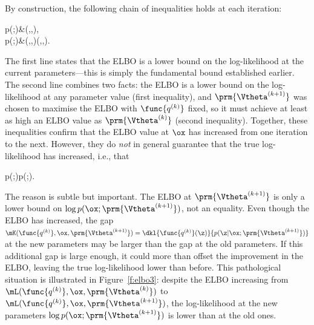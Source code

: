 By construction, the following chain of inequalities holds at each iteration:
\begin{myalign}
\log p(\ox;)&\geq \mL(,\ox,),\\
\log p(\ox;)&\geq \mL(,\ox,)\geq \mL(,\ox,).
\end{myalign}
The first line states that the ELBO is a lower bound on the log-likelihood at the current
parameters---this is simply the fundamental bound established earlier. The second line
combines two facts: the ELBO is a lower bound on the log-likelihood at any parameter
value (first inequality), and $\prm{\Vtheta^{(k+1)}}$ was chosen to maximise the ELBO
with $\func{q^{(k)}}$ fixed, so it must achieve at least as high an ELBO value as
$\prm{\Vtheta^{(k)}}$ (second inequality). Together, these inequalities confirm that the
ELBO value at $\ox$ has increased from one iteration to the next. However, they do
\emph{not} in general guarantee that the true log-likelihood has increased, i.e., that
\begin{myequation}
\log p(\ox;)\geq \log p(\ox;).
\end{myequation}

The reason is subtle but important. The ELBO at $\prm{\Vtheta^{(k+1)}}$ is only a lower
bound on $\log p(\ox;\prm{\Vtheta^{(k+1)}})$, not an equality. Even though the ELBO has
increased, the gap $\mK(\func{q^{(k)}},\ox,\prm{\Vtheta^{(k+1)}}) =
\dkl{\func{q^{(k)}}(\z)}{p(\z|\ox;\prm{\Vtheta^{(k+1)}})}$ at the new parameters may be
larger than the gap at the old parameters. If this additional gap is large enough, it could
more than offset the improvement in the ELBO, leaving the true log-likelihood lower than
before. This pathological situation is illustrated in Figure~\ref{f:elbo3}: despite the ELBO
increasing from $\mL(\func{q^{(k)}},\ox,\prm{\Vtheta^{(k)}})$ to
$\mL(\func{q^{(k)}},\ox,\prm{\Vtheta^{(k+1)}})$, the log-likelihood at the new parameters
$\log p(\ox;\prm{\Vtheta^{(k+1)}})$ is lower than at the old ones.

